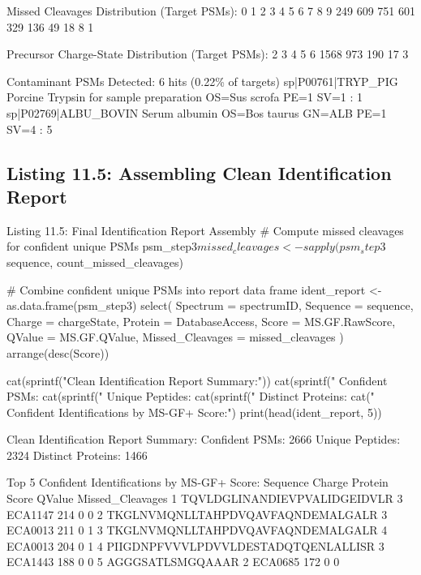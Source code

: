 \documentclass[11pt,twoside,openright]{book}
\begin{document}
\begin{routput}
Missed Cleavages Distribution (Target PSMs):
  0   1   2   3   4   5   6   7   8   9 
249 609 751 601 329 136  49  18   8   1 

Precursor Charge-State Distribution (Target PSMs):
   2    3    4    5    6 
1568  973  190   17    3 

Contaminant PSMs Detected: 6 hits (0.22\% of targets)
sp|P00761|TRYP\_PIG Porcine Trypsin for sample preparation OS=Sus scrofa PE=1 SV=1 : 1
sp|P02769|ALBU\_BOVIN Serum albumin OS=Bos taurus GN=ALB PE=1 SV=4 : 5
\end{routput}

\subsection{Listing 11.5: Assembling Clean Identification Report}

\begin{rchunk}{Listing 11.5: Final Identification Report Assembly}
# Compute missed cleavages for confident unique PSMs
psm_step3$missed_cleavages <- sapply(psm_step3$sequence, count_missed_cleavages)

# Combine confident unique PSMs into report data frame
ident_report <- as.data.frame(psm_step3) %
  select(
    Spectrum = spectrumID,
    Sequence = sequence,
    Charge = chargeState,
    Protein = DatabaseAccess,
    Score = MS.GF.RawScore,
    QValue = MS.GF.QValue,
    Missed_Cleavages = missed_cleavages
  ) %
  arrange(desc(Score))

cat(sprintf("Clean Identification Report Summary:\n"))
cat(sprintf("  Confident PSMs:    %
cat(sprintf("  Unique Peptides:   %
cat(sprintf("  Distinct Proteins: %
cat(" Confident Identifications by MS-GF+ Score:\n")
print(head(ident_report, 5))
\end{rchunk}

\begin{routput}
Clean Identification Report Summary:
  Confident PSMs:    2666
  Unique Peptides:   2324
  Distinct Proteins: 1466

Top 5 Confident Identifications by MS-GF+ Score:
  Sequence                          Charge Protein Score QValue Missed\_Cleavages
1 TQVLDGLINANDIEVPVALIDGEIDVLR      3      ECA1147 214   0      0
2 TKGLNVMQNLLTAHPDVQAVFAQNDEMALGALR 3      ECA0013 211   0      1
3 TKGLNVMQNLLTAHPDVQAVFAQNDEMALGALR 4      ECA0013 204   0      1
4 PIIGDNPFVVVLPDVVLDESTADQTQENLALLISR 3    ECA1443 188   0      0
5 AGGGSATLSMGQAAAR                  2      ECA0685 172   0      0
\end{routput}
\end{document}
